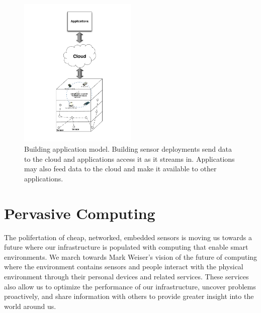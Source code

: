 \begin{figure}[h!]
\begin{center}
\includegraphics[width=0.5\textwidth]{figs/BuildingAppModel}
\caption{Building application model.  Building sensor deployments send data to the cloud and applications access it as it streams in.
Applications may also feed data to the cloud and make it available to other applications.}
\label{fig:buidlingapp}
\end{center}
\end{figure}



\section{Pervasive Computing}
The polifertation of cheap, networked, embedded sensors is moving us towards a future where our infrastructure is 
populated with computing that enable smart environments.  We march towards Mark Weiser's vision of the future of
computing \cite{uqicomp_vision} where the environment contains sensors and people interact with the 
physical environment through their personal devices and related services.  These services also allow us to 
optimize the performance of our infrastructure, uncover problems proactively,
and share information with others to provide greater insight into the world around us.  

